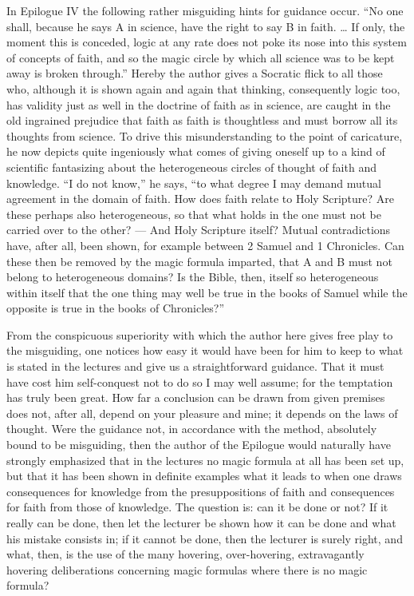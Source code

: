 \documentclass[12pt]{book}
\newcommand{\opage}[1]{\marginnote{\footnotesize\textit{[#1]}}}
\begin{document}
In Epilogue IV the following rather misguiding hints for guidance occur.
``No one shall, because he says A in science, have the right to say B in
faith. \ldots{} If only, the moment this is conceded, logic at any rate
does not poke its nose into this system of concepts of faith, and so the
magic circle by
\opage{315}\setcounter{footnote}{0}%
which all science was to be kept away is broken through.'' Hereby the
author gives a Socratic flick to all those who, although it is shown again
and again that thinking, consequently logic too, has validity just as
well in the doctrine of faith as in science, are caught in the old
ingrained prejudice that faith as faith is thoughtless and must borrow all
its thoughts from science. To drive this misunderstanding to the point of
caricature, he now depicts quite ingeniously what comes of giving oneself
up to a kind of scientific fantasizing about the heterogeneous circles of
thought of faith and knowledge. ``I do not know,'' he says, ``to what
degree I may demand mutual agreement in the domain of faith. How does
faith relate to Holy Scripture? Are these perhaps also heterogeneous, so
that what holds in the one must not be carried over to the other? --- And
Holy Scripture itself? Mutual contradictions have, after all, been shown,
for example between 2 Samuel and 1 Chronicles. Can these then be removed
by the magic formula imparted, that A and B must not belong to
heterogeneous domains? Is the Bible, then, itself so heterogeneous within
itself that the one thing may well be true in the books of Samuel while
the opposite is true in the books of Chronicles?''

From the conspicuous superiority with which the author here gives free
play to the misguiding, one notices how easy it would have been for him to
keep to what is stated in the lectures and give us a straightforward
guidance. That it must have cost him self-conquest not to do so I may well
assume; for the temptation has truly been great. How far a conclusion can
be drawn from given premises does not, after all, depend on your pleasure
and mine; it depends on the laws of thought. Were the guidance not, in
accordance with the method, absolutely bound to be misguiding, then the
author of the Epilogue would naturally have strongly emphasized that in
the lectures no magic formula at all has been set up, but that it has
been shown in definite examples what it leads to when one draws
consequences for knowledge
\opage{316}\setcounter{footnote}{0}%
from the presuppositions of faith and consequences for faith from those
of knowledge. The question is: can it be done or not? If it really can be
done, then let the lecturer be shown how it can be done and what his
mistake consists in; if it cannot be done, then the lecturer is surely
right, and what, then, is the use of the many hovering, over-hovering,
extravagantly hovering deliberations concerning magic formulas where
there is no magic formula?
\end{document}
